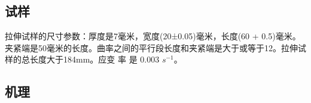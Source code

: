 \documentclass[
class = book,
zihao = -4,
font = noto,
paper = a4paper,
openany
]{easybook}
\begin{document}
\subsection{试样}
拉伸试样的尺寸参数：厚度是7毫米，宽度(20±0.05)毫米，长度(60 + 0.5)毫米。夹紧端是50毫米的长度。曲率之间的平行段长度和夹紧端是大于或等于12。拉伸试样的总长度大于184mm。应变 率 是 0.003 $ s^{-1} $。
\newpage
\subsection{机理}
%
\end{document}
